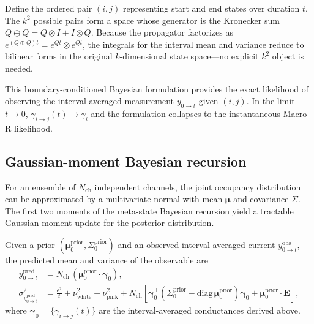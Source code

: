 \documentclass[9pt]{elife}
\begin{document}
	\begin{tcolorbox}[colback=gray!5,colframe=gray!60,title=Boundary-conditioned two-point states (“meta-states”)]
		Define the ordered pair $(i,j)$ representing start and end states over duration $t$.  
		The $k^2$ possible pairs form a space whose generator is the Kronecker sum
		$Q\oplus Q = Q\otimes I + I\otimes Q$.  
		Because the propagator factorizes as $e^{(Q\oplus Q)t}=e^{Qt}\otimes e^{Qt}$, the integrals for the interval mean and variance reduce to bilinear forms in the original $k$-dimensional state space—no explicit $k^2$ object is needed.
	\end{tcolorbox}
	
	This boundary-conditioned Bayesian formulation provides the exact likelihood of observing the interval-averaged measurement $\bar y_{0\to t}$ given $(i,j)$.  
	In the limit $t\!\to\!0$, $\gamma_{i\to j}(t)\!\to\!\gamma_i$ and the formulation collapses to the instantaneous Macro R likelihood.
	
	\subsection*{Gaussian-moment Bayesian recursion}
	
	For an ensemble of $N_{\mathrm{ch}}$ independent channels, the joint occupancy distribution can be approximated by a multivariate normal with mean $\bm{\mu}$ and covariance $\Sigma$.  
	The first two moments of the meta-state Bayesian recursion yield a tractable Gaussian-moment update for the posterior distribution.
	
	Given a prior $(\bm{\mu}^{\mathrm{prior}}_0,\Sigma^{\mathrm{prior}}_0)$ and an observed interval-averaged current $y^{\mathrm{obs}}_{0\to t}$, the predicted mean and variance of the observable are
	\begin{align}
		y^{\mathrm{pred}}_{0\to t} &= N_{\mathrm{ch}}\,(\bm{\mu}^{\mathrm{prior}}_0\!\cdot\!\bm{\gamma}_0),\\
		\sigma^2_{y^{\mathrm{pred}}_{0\to t}} &= 
		\frac{\epsilon^2}{t} + \nu^2_{\mathrm{white}} + \nu^2_{\mathrm{pink}}
		+ N_{\mathrm{ch}}\!\left[\bm{\gamma}_0^\top(\Sigma^{\mathrm{prior}}_0-\mathrm{diag}\,\bm{\mu}^{\mathrm{prior}}_0)\bm{\gamma}_0 
		+ \bm{\mu}^{\mathrm{prior}}_0\!\cdot\!\mathbf{E}\right],
	\end{align}
	where $\bm{\gamma}_0=\{\gamma_{i\to j}(t)\}$ are the interval-averaged conductances derived above.  
	
\end{document}
